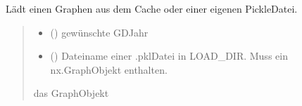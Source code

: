 \documentclass[a4paper,10pt,ngerman]{sphinxmanual}
\begin{document}
\begin{fulllineitems}
\label{\detokenize{api:src.main.init_original}}
\pysigstartsignatures
\pysiglinewithargsret
{}
{\sphinxparamcomma {}}
{}
\pysigstopsignatures
\sphinxAtStartPar
Lädt einen Graphen aus dem Cache oder einer eigenen Pickle\sphinxhyphen{}Datei.
\begin{quote}\begin{description}
\begin{itemize}
\item {} 
\sphinxAtStartPar
{} () \textendash{} gewünschte GD\sphinxhyphen{}Jahr

\item {} 
\sphinxAtStartPar
{} () \textendash{} Dateiname einer .pkl\sphinxhyphen{}Datei in LOAD\_DIR. Muss ein nx.Graph\sphinxhyphen{}Objekt enthalten.

\end{itemize}

\sphinxAtStartPar
das Graph\sphinxhyphen{}Objekt

\sphinxAtStartPar
{}

\end{description}\end{quote}

\end{fulllineitems}


\begin{fulllineitems}
\label{\detokenize{api:src.main.main}}
\pysigstartsignatures
\pysiglinewithargsret
{}
{}
{}
\pysigstopsignatures
\end{fulllineitems}

\end{document}
